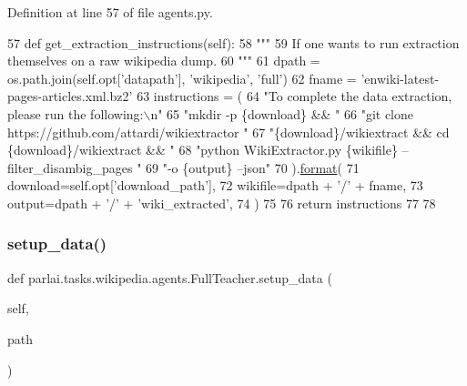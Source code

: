 Definition at line 57 of file agents.\+py.


\begin{DoxyCode}
57     \textcolor{keyword}{def }get\_extraction\_instructions(self):
58         \textcolor{stringliteral}{"""}
59 \textcolor{stringliteral}{        If one wants to run extraction themselves on a raw wikipedia dump.}
60 \textcolor{stringliteral}{        """}
61         dpath = os.path.join(self.opt[\textcolor{stringliteral}{'datapath'}], \textcolor{stringliteral}{'wikipedia'}, \textcolor{stringliteral}{'full'})
62         fname = \textcolor{stringliteral}{'enwiki-latest-pages-articles.xml.bz2'}
63         instructions = (
64             \textcolor{stringliteral}{"To complete the data extraction, please run the following:\(\backslash\)n"}
65             \textcolor{stringliteral}{"mkdir -p \{download\} && "}
66             \textcolor{stringliteral}{"git clone https://github.com/attardi/wikiextractor "}
67             \textcolor{stringliteral}{"\{download\}/wikiextract && cd \{download\}/wikiextract && "}
68             \textcolor{stringliteral}{"python WikiExtractor.py \{wikifile\} --filter\_disambig\_pages "}
69             \textcolor{stringliteral}{"-o \{output\} --json"}
70         ).\hyperlink{namespaceparlai_1_1chat__service_1_1services_1_1messenger_1_1shared__utils_a32e2e2022b824fbaf80c747160b52a76}{format}(
71             download=self.opt[\textcolor{stringliteral}{'download\_path'}],
72             wikifile=dpath + \textcolor{stringliteral}{'/'} + fname,
73             output=dpath + \textcolor{stringliteral}{'/'} + \textcolor{stringliteral}{'wiki\_extracted'},
74         )
75 
76         \textcolor{keywordflow}{return} instructions
77 
78 
\end{DoxyCode}
\mbox{\label{classparlai_1_1tasks_1_1wikipedia_1_1agents_1_1FullTeacher_a969b628c85be8be59009ef29fb0855fc}} 
\subsubsection{\texorpdfstring{setup\+\_\+data()}{setup\_data()}}
{\footnotesize\ttfamily def parlai.\+tasks.\+wikipedia.\+agents.\+Full\+Teacher.\+setup\+\_\+data (\begin{DoxyParamCaption}\item[{}]{self,  }\item[{}]{path }\end{DoxyParamCaption})}




